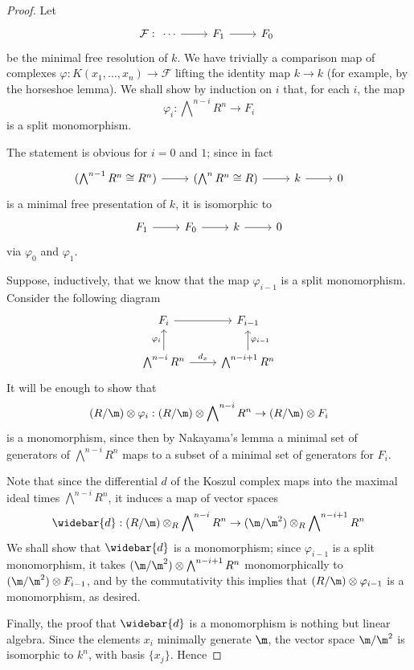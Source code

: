 \begin{proof}
Let
\[\mathcal{F}:\begin{tikzcd}
\cdots\ar[r]&F_1\ar[r]&F_0
\end{tikzcd}\]
be the minimal free resolution of $k$. We have trivially a comparison map of complexes $\varphi:K(x_1,\dots,x_n)\to\mathcal{F}$ lifting the identity map $k\to k$ (for example, by the horseshoe lemma). We shall
show by induction on $i$ that, for each $i$, the map
\[\varphi_i:\bigwedge\nolimits^{n-i}R^n\to F_i\]
is a split monomorphism.\par
The statement is obvious for $i=0$ and $1$; since in fact
\[\begin{tikzcd}
(\bigwedge^{n-1}R^n\cong R^n)\ar[r]&(\bigwedge^nR^n\cong R)\ar[r]&k\ar[r]&0
\end{tikzcd}\]
is a minimal free presentation of $k$, it is isomorphic to
\[\begin{tikzcd}
F_1\ar[r]&F_0\ar[r]&k\ar[r]&0
\end{tikzcd}\]
via $\varphi_0$ and $\varphi_1$.\par
Suppose, inductively, that we know that the map $\varphi_{i-1}$ is a split monomorphism. Consider the following diagram
\[\begin{tikzcd}
F_i\ar[r]&F_{i-1}\\
\bigwedge^{n-i}R^n\ar[r,"d_x"]\ar[u,"\varphi_i"]&\bigwedge^{n-i+1}R^n\ar[u,swap,"\varphi_{i-1}"]
\end{tikzcd}\]
It will be enough to show that
\[(R/\m)\otimes\varphi_i:(R/\m)\otimes\bigwedge\nolimits^{n-i}R^n\to (R/\m)\otimes F_i\]
is a monomorphism, since then by Nakayama's lemma a minimal set of generators of $\bigwedge^{n-i}R^n$ maps to a subset of a minimal set of generators for $F_i$.\par
Note that since the differential $d$ of the Koszul complex maps into the
maximal ideal times $\bigwedge^{n-i}R^n$, it induces a map of vector spaces
\[\widebar{d}:(R/\m)\otimes_R\bigwedge\nolimits^{n-i}R^n\to(\m/\m^2)\otimes_R\bigwedge\nolimits^{n-i+1}R^n\]
We shall show that $\widebar{d}$ is a monomorphism; since $\varphi_{i-1}$ is a split monomorphism, it takes $(\m/\m^2)\otimes\bigwedge\nolimits^{n-i+1}R^n$ monomorphically to $(\m/\m^2)\otimes F_{i-1}$, and by the commutativity
this implies that $(R/\m)\otimes\varphi_{i-1}$ is a monomorphism, as desired.\par
Finally, the proof that $\widebar{d}$ is a monomorphism is nothing but linear algebra. Since the elements $x_i$ minimally generate $\m$, the vector space $\m/\m^2$ is isomorphic to $k^n$, with basis $\{x_j\}$. Hence

\end{proof}
